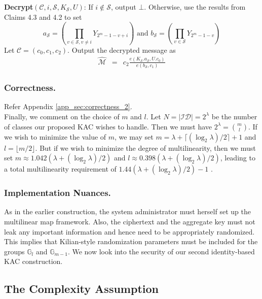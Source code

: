 \noindent\textbf{Decrypt}$(\mathcal{C},i,\mathcal{S},K_{\mathcal{S}},U)$: If $i\notin\mathcal{S}$, output $\bot$. Otherwise, use the results from Claims 4.3 and 4.2 to set
\begin{equation}
a_{\mathcal{S}}=\left(\prod_{v\in\mathcal{S},v\neq i}Y_{2^m-1-v+i}\right) \text{ and } b_{\mathcal{S}}=\left(\prod_{v\in\mathcal{S}}Y_{2^m-1-v}\right)\nonumber
\end{equation}
Let $\mathcal{C}=(c_0,c_1,c_2)$. Output the decrypted message as  
\begin{eqnarray} 
\hat{\mathcal{M}}&=&c_2\frac{{e}(K_{\mathcal{S}}.a_{\mathcal{S}},U.c_0)}{{e}(b_{\mathcal{S}},c_1)} \nonumber
\end{eqnarray}

\subsubsection{Correctness.} Refer Appendix \ref{app_sec:correctness_2}.\\

\noindent Finally, we comment on the choice of $m$ and $l$. Let $N=|\mathcal{ID}|=2^{\lambda}$ be the number of classes our proposed KAC wishes to handle. Then we must have $2^{\lambda}=\binom{m}{l}$. If we wish to minimize the value of $m$, we may set $m=\lambda+\lceil(\log_2\lambda)/2\rceil+1$ and $l=\lfloor m/2\rfloor$. But if we wish to minimize the degree of multilinearity, then we must set $m\approx 1.042(\lambda+(\log_2\lambda)/2)$ and $l\approx 0.398(\lambda+(\log_2\lambda)/2)$, leading to a total multilinearity requirement of $1.44(\lambda+(\log_2\lambda)/2)-1$ \cite{boneh2014low}.

\subsubsection{Implementation Nuances.} As in the earlier construction, the system administrator must herself set up the multilinear map framework. Also, the ciphertext and the aggregate key must not leak any important information and hence need to be appropriately randomized. This implies that Kilian-style randomization parameters must be included for the groups $\mathbb{G}_{l}$ and $\mathbb{G}_{m-1}$. We now look into the security of our second identity-based KAC construction.

\subsection{The Complexity Assumption}
\label{subsec:complexity_2}

